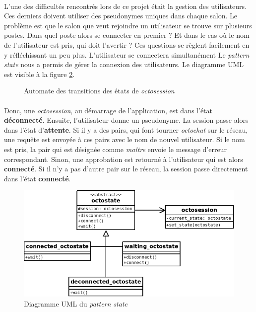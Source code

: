 \documentclass[a4paper]{article}
\begin{document}
			\paragraph{}{
			L'une des difficultés rencontrés lors de ce projet était la gestion des utilisateurs. Ces derniers doivent
			utiliser des pseudonymes uniques dans chaque salon. Le problème est que le salon que veut rejoindre un utilisateur
			se trouve sur plusieurs postes. Dans quel poste alors se connecter en premier ? Et dans le cas où le nom
			de l'utilisateur est pris, qui doit l'avertir ? Ces questions se règlent facilement en y réfléchissant un peu plus.
			L'utilisateur se connectera simultanément
			Le \textit{pattern state} nous a permis de gérer la connexion des utilisateurs. Le diagramme UML est visible à la figure \ref{state_uml}.
			}
			
			\begin{figure}[!h]
				\centering
				
				\caption{\label{state_schema} Automate des transitions des états de \textit{octosession}}
			\end{figure}
			
			\paragraph{}{
			Donc, une \textit{octosession}, au démarrage de l'application, est dans l'état \textbf{déconnecté}.
			Ensuite, l'utilisateur donne un pseudonyme. La session passe alors dans l'état d'\textbf{attente}.
			Si il y a des pairs, qui font tourner \textit{octochat} sur le réseau, une requête est envoyée à ces pairs 
			avec le nom de nouvel utilisateur. Si le nom est pris, la pair qui est désignée comme \textit{maître} 
			envoie le message d'erreur correspondant. Sinon, une approbation est retourné à l'utilisateur qui est 
			alors \textbf{connecté}. \newline
			Si il n'y a pas d'autre pair sur le réseau, la session passe directement dans l'état \textbf{connecté}.
			}
			
			\begin{figure}[!h]
				\centering
				\includegraphics[scale=0.6]{UML/state.png}
				\caption{\label{state_uml} Diagramme UML du \textit{pattern state}}
			\end{figure}
			
\end{document}
